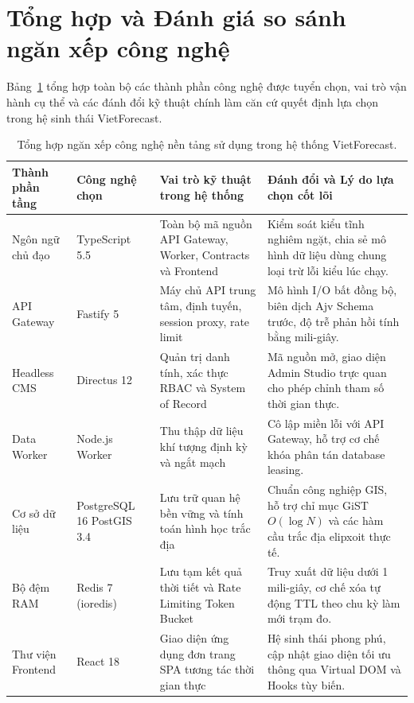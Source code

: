 \section{Tổng hợp và Đánh giá so sánh ngăn xếp công nghệ}

Bảng~\ref{tab:tech_stack_summary_vi} tổng hợp toàn bộ các thành phần công nghệ được tuyển chọn, vai trò vận hành cụ thể và các đánh đổi kỹ thuật chính làm căn cứ quyết định lựa chọn trong hệ sinh thái VietForecast.

\begin{table}[H]
\centering
\caption{Tổng hợp ngăn xếp công nghệ nền tảng sử dụng trong hệ thống VietForecast.}
\label{tab:tech_stack_summary_vi}
\footnotesize
\renewcommand{\arraystretch}{0.92}
\begin{tabularx}{\textwidth}{>{\raggedright\arraybackslash}p{2.6cm} >{\raggedright\arraybackslash}p{2.2cm} >{\raggedright\arraybackslash}p{4.2cm} >{\raggedright\arraybackslash}X}
\toprule
Thành phần tầng & Công nghệ chọn & Vai trò kỹ thuật trong hệ thống & Đánh đổi và Lý do lựa chọn cốt lõi \\
\midrule
Ngôn ngữ chủ đạo & TypeScript 5.5 & Toàn bộ mã nguồn API Gateway, Worker, Contracts và Frontend & Kiểm soát kiểu tĩnh nghiêm ngặt, chia sẻ mô hình dữ liệu dùng chung loại trừ lỗi kiểu lúc chạy. \\
API Gateway & Fastify 5 & Máy chủ API trung tâm, định tuyến, session proxy, rate limit & Mô hình I/O bất đồng bộ, biên dịch Ajv Schema trước, độ trễ phản hồi tính bằng mili-giây. \\
Headless CMS & Directus 12 & Quản trị danh tính, xác thực RBAC và System of Record & Mã nguồn mở, giao diện Admin Studio trực quan cho phép chỉnh tham số thời gian thực. \\
Data Worker & Node.js Worker & Thu thập dữ liệu khí tượng định kỳ và ngắt mạch & Cô lập miền lỗi với API Gateway, hỗ trợ cơ chế khóa phân tán database leasing. \\
Cơ sở dữ liệu & PostgreSQL 16 PostGIS 3.4 & Lưu trữ quan hệ bền vững và tính toán hình học trắc địa & Chuẩn công nghiệp GIS, hỗ trợ chỉ mục GiST $O(\log N)$ và các hàm cầu trắc địa elipxoit thực tế. \\
Bộ đệm RAM & Redis 7 (ioredis) & Lưu tạm kết quả thời tiết và Rate Limiting Token Bucket & Truy xuất dữ liệu dưới 1 mili-giây, cơ chế xóa tự động TTL theo chu kỳ làm mới trạm đo. \\
Thư viện Frontend & React 18 & Giao diện ứng dụng đơn trang SPA tương tác thời gian thực & Hệ sinh thái phong phú, cập nhật giao diện tối ưu thông qua Virtual DOM và Hooks tùy biến. \\

\end{tabularx}
\end{table}
